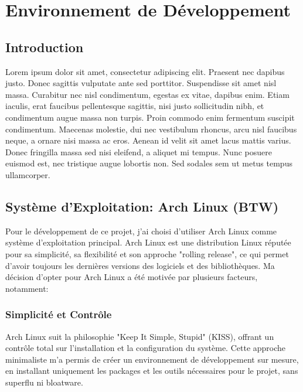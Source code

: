 \chapter{Environnement de Développement}
\label{chap:Chapter 2 title}
\section*{Introduction}


Lorem ipsum dolor sit amet, consectetur adipiscing elit. Praesent nec dapibus justo. Donec sagittis vulputate ante sed porttitor. Suspendisse sit amet nisl massa. Curabitur nec nisl condimentum, egestas ex vitae, dapibus enim. Etiam iaculis, erat faucibus pellentesque sagittis, nisi justo sollicitudin nibh, et condimentum augue massa non turpis. Proin commodo enim fermentum suscipit condimentum. Maecenas molestie, dui nec vestibulum rhoncus, arcu nisl faucibus neque, a ornare nisi massa ac eros. Aenean id velit sit amet lacus mattis varius. Donec fringilla massa sed nisi eleifend, a aliquet mi tempus. Nunc posuere euismod est, nec tristique augue lobortis non. Sed sodales sem ut metus tempus ullamcorper.


\pagebreak


\section{Système d'Exploitation: Arch Linux (BTW)}

\hspace{16pt}Pour le développement de ce projet, j'ai choisi d'utiliser Arch Linux comme système d'exploitation principal. Arch Linux est une distribution Linux réputée pour sa simplicité, sa flexibilité et son approche "rolling release", ce qui permet d'avoir toujours les dernières versions des logiciels et des bibliothèques. Ma décision d'opter pour Arch Linux a été motivée par plusieurs facteurs, notamment:

\subsection{Simplicité et Contrôle}

\hspace{16pt}Arch Linux suit la philosophie "Keep It Simple, Stupid" (KISS), offrant un contrôle total sur l'installation et la configuration du système. Cette approche minimaliste m'a permis de créer un environnement de développement sur mesure, en installant uniquement les packages et les outils nécessaires pour le projet, sans superflu ni bloatware.

